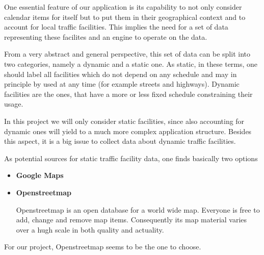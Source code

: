 One essential feature of our application is its capability to not only consider calendar items for itself but to put them in their geographical context and to account for local traffic facilities. This implies the need for a set of data representing these facilites and an engine to operate on the data.\newline

From a very abstract and general perspective, this set of data can be split into two categories, namely a dynamic and a static one. As static, in these terms, one should label all facilities which do not depend on any schedule and may in principle by used at any time (for example streets and highways). Dynamic facilities are the ones, that have a more or less fixed schedule constraining their usage.\newline

In this project we will only consider static facilities, since also accounting for dynamic ones will yield to a much more complex application structure. Besides this aspect, it is a big issue to collect data about dynamic traffic facilities.\newline
 
As potential sources for static traffic facility data, one finds basically two options

\begin{itemize}
 
	\item \textbf{Google Maps}
	
	\item \textbf{Openstreetmap}
	
		Openstreetmap is an open database for a world wide map. Everyone is free to add, change and remove map items. Consequently its map material varies over a hugh scale in both quality and actuality. 
  
\end{itemize} 

For our project, Openstreetmap seems to be the one to choose.
